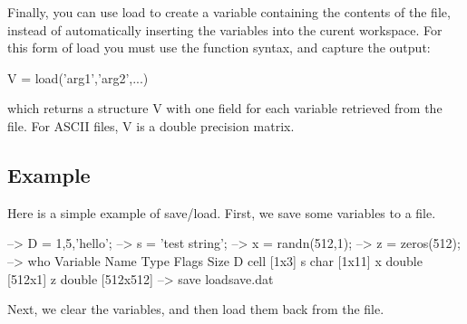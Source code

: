 Finally, you can use {\ttfamily load} to create a variable containing the contents of the file, instead of automatically inserting the variables into the curent workspace. For this form of {\ttfamily load} you must use the function syntax, and capture the output\-: \begin{DoxyVerb}  V = load('arg1','arg2',...)
\end{DoxyVerb}
 which returns a structure {\ttfamily V} with one field for each variable retrieved from the file. For A\-S\-C\-I\-I files, {\ttfamily V} is a double precision matrix.\hypertarget{variables_struct_Example}{}\subsection{Example}\label{variables_struct_Example}
Here is a simple example of {\ttfamily save}/{\ttfamily load}. First, we save some variables to a file.


\begin{DoxyVerbInclude}
--> D = {1,5,'hello'};
--> s = 'test string';
--> x = randn(512,1);
--> z = zeros(512);
--> who
  Variable Name       Type   Flags             Size
              D      cell                    [1x3]
              s      char                    [1x11]
              x    double                    [512x1]
              z    double                    [512x512]
--> save loadsave.dat
\end{DoxyVerbInclude}


Next, we clear the variables, and then load them back from the file.


